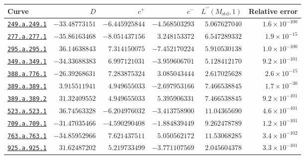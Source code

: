 \begin{table}[htbp]
\centering\scriptsize
\setlength{\tabcolsep}{3pt}
\renewcommand{\arraystretch}{1.3}
\begin{tabular}{@{}lrrrrr@{}}
\toprule
Curve & $D$ & $c^+$ & $c^-$ & $L^{\prime\prime}(M_{\mathrm{std}},1)$ & Relative error \\
\midrule
\href{https://www.lmfdb.org/Genus2Curve/Q/249/a/249/1}{\texttt{249.a.249.1}} & $-33.48773151$ & $-6.445925844$ & $-4.568503293$ & $5.067627040$ & $1.6\times 10^{-100}$ \\
\href{https://www.lmfdb.org/Genus2Curve/Q/277/a/277/1}{\texttt{277.a.277.1}} & $-35.86163468$ & $-8.051437156$ & $3.248153372$ & $6.547289332$ & $1.9\times 10^{-15}$ \\
\href{https://www.lmfdb.org/Genus2Curve/Q/295/a/295/1}{\texttt{295.a.295.1}} & $36.14638843$ & $7.314150075$ & $-7.452170224$ & $5.910530138$ & $1.0\times 10^{-100}$ \\
\href{https://www.lmfdb.org/Genus2Curve/Q/349/a/349/1}{\texttt{349.a.349.1}} & $-34.33688383$ & $6.997121031$ & $-3.959606701$ & $5.128412170$ & $9.2\times 10^{-101}$ \\
\href{https://www.lmfdb.org/Genus2Curve/Q/388/a/776/1}{\texttt{388.a.776.1}} & $-26.39268631$ & $7.283875324$ & $3.085043444$ & $2.617025628$ & $2.6\times 10^{-15}$ \\
\href{https://www.lmfdb.org/Genus2Curve/Q/389/a/389/1}{\texttt{389.a.389.1}} & $3.915511941$ & $4.949655033$ & $-2.697953166$ & $7.466538845$ & $1.7\times 10^{-30}$ \\
\href{https://www.lmfdb.org/Genus2Curve/Q/389/a/389/2}{\texttt{389.a.389.2}} & $31.32409552$ & $4.949655033$ & $5.395906331$ & $7.466538845$ & $9.2\times 10^{-101}$ \\
\href{https://www.lmfdb.org/Genus2Curve/Q/523/a/523/1}{\texttt{523.a.523.1}} & $36.74563328$ & $-6.204976032$ & $-3.413758900$ & $11.04365690$ & $4.6\times 10^{-101}$ \\
\href{https://www.lmfdb.org/Genus2Curve/Q/709/a/709/1}{\texttt{709.a.709.1}} & $-31.47035466$ & $-4.590290408$ & $-1.884839449$ & $9.262478789$ & $1.2\times 10^{-101}$ \\
\href{https://www.lmfdb.org/Genus2Curve/Q/763/a/763/1}{\texttt{763.a.763.1}} & $-34.85952966$ & $7.621437511$ & $5.050562172$ & $11.53068285$ & $3.4\times 10^{-102}$ \\
\href{https://www.lmfdb.org/Genus2Curve/Q/925/a/925/1}{\texttt{925.a.925.1}} & $31.62487202$ & $5.219733499$ & $-3.771107569$ & $2.045604378$ & $3.3\times 10^{-101}$ \\

\end{tabular}
\end{table}
